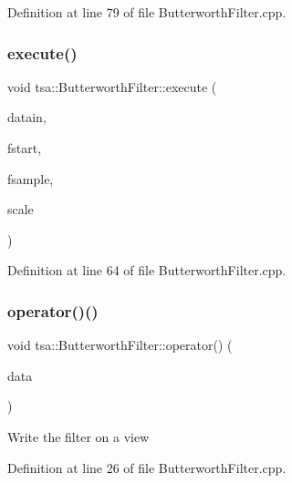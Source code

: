 Definition at line 79 of file Butterworth\+Filter.\+cpp.

\mbox{\label{classtsa_1_1_butterworth_filter_acff437ecb48fcb6cae8865bba97ac533}} 
\subsubsection{\texorpdfstring{execute()}{execute()}\hspace{0.1cm}{\footnotesize\ttfamily [2/2]}}
{\footnotesize\ttfamily void tsa\+::\+Butterworth\+Filter\+::execute (\begin{DoxyParamCaption}\item[{\hyperlink{namespacetsa_a86348fef1603a135fe5fba9e5f5486ee}{Cmatrix} \&}]{datain,  }\item[{double}]{fstart,  }\item[{double}]{fsample,  }\item[{double}]{scale }\end{DoxyParamCaption})}



Definition at line 64 of file Butterworth\+Filter.\+cpp.

\mbox{\label{classtsa_1_1_butterworth_filter_aa38eef705674e3c799e23bd145d243c0}} 
\subsubsection{\texorpdfstring{operator()()}{operator()()}\hspace{0.1cm}{\footnotesize\ttfamily [1/2]}}
{\footnotesize\ttfamily void tsa\+::\+Butterworth\+Filter\+::operator() (\begin{DoxyParamCaption}\item[{\hyperlink{namespacetsa_ab32775c889b53c40fa83939f22372b75}{Seq\+View\+Complex} \&}]{data }\end{DoxyParamCaption})}

Write the filter on a view 

Definition at line 26 of file Butterworth\+Filter.\+cpp.

